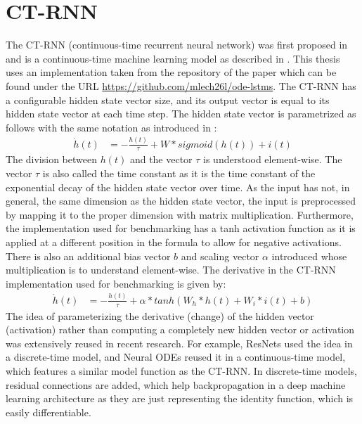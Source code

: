 \documentclass[draft,final]{vutinfth} %
\begin{document}
    \section{CT-RNN} \label{ctrnn}
    The CT-RNN (continuous-time recurrent neural network) was first proposed in \cite{CTRNN} and is a continuous-time machine learning model as described in .
    This thesis uses an implementation taken from the repository of the paper \cite{ODELSTM} which can be found under the URL \url{https://github.com/mlech26l/ode-lstms}.
    The CT-RNN has a configurable hidden state vector size, and its output vector is equal to its hidden state vector at each time step.
    The hidden state vector is parametrized as follows \cite[p. 2]{CTRNN} with the same notation as introduced in :
    \begin{align}
        \label{paper_ct_rnn_function}
        \dot h(t) &= -\frac{h(t)}{\tau} + W * sigmoid(h(t)) + i(t)
    \end{align}
    The division between $h(t)$ and the vector $\tau$ is understood element-wise. The vector $\tau$ is also called the time constant as it is the time constant of the exponential decay of the hidden state vector over time.
    As the input has not, in general, the same dimension as the hidden state vector, the input is preprocessed by mapping it to the proper dimension with matrix multiplication.
    Furthermore, the implementation used for benchmarking has a tanh activation function as it is applied at a different position in the formula to allow for negative activations.
    There is also an additional bias vector $b$ and scaling vector $\alpha$ introduced whose multiplication is to understand element-wise.
    The derivative in the CT-RNN implementation used for benchmarking is given by:
    \begin{align}
        \label{used_ct_rnn_function}
        \dot h(t) &= -\frac{h(t)}{\tau} + \alpha * tanh(W_h * h(t) + W_i * i(t) + b)
    \end{align}
    The idea of parameterizing the derivative (change) of the hidden vector (activation) rather than computing a completely new hidden vector or activation was extensively reused in recent research.
    For example, ResNets \cite{ResNet} used the idea in a discrete-time model, and Neural ODEs \cite{NeuralODEs} reused it in a continuous-time model, which features a similar model function as the CT-RNN.
    In discrete-time models, residual connections are added, which help backpropagation in a deep machine learning architecture as they are just representing the identity function, which is easily differentiable.
\end{document}
